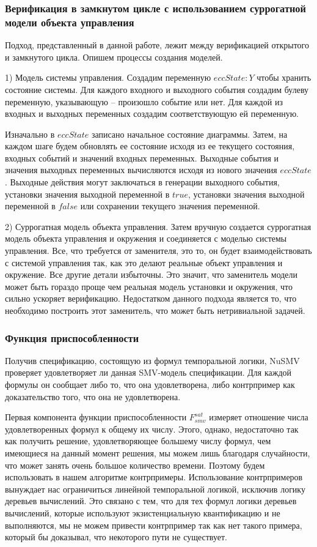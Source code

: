 \documentclass[14pt]{article}
\begin{document}
\subsubsection{Верификация в замкнутом цикле с использованием суррогатной модели
объекта управления}

Подход, представленный в данной работе, лежит между верификацией открытого и
замкнутого цикла. Опишем процессы создания моделей.

1) Модель системы управления. Создадим переменную $eccState : Y$ чтобы хранить
состояние системы. Для каждого входного и выходного события создадим
булеву переменную, указывающую -- произошло событие или нет. Для каждой из
входных и выходных переменных создадим соответствующую ей переменную.

Изначально в $eccState$ записано начальное состояние диаграммы. Затем, на
каждом шаге будем обновлять ее состояние исходя из ее текущего состояния,
входных событий и значений входных переменных. Выходные события и значения
выходных переменных вычисляются исходя из нового значения $eccState$. Выходные
действия могут заключаться в генерации выходного события, установки значения
выходной переменной в $true$, установки значения выходной переменной в $false$
или сохранении текущего значения переменной.

2) Суррогатная модель объекта управления. Затем вручную создается суррогатная модель
объекта управления и окружения и соединяется с моделью системы управления. Все, что
требуется от заменителя, это то, он будет взаимодействовать с системой управления так,
как это делают реальные объект управления и окружение. Все другие детали избыточны. Это
значит, что заменитель модели может быть гораздо проще чем реальная модель
установки и окружения, что сильно ускоряет верификацию. Недостатком данного
подхода является то, что необходимо построить этот заменитель, что может быть
нетривиальной задачей.

\subsubsection{Функция приспособленности}

Получив спецификацию, состоящую из формул темпоральной логики, NuSMV проверяет
удовлетворяет ли данная SMV-модель спецификации. Для каждой формулы он сообщает
либо то, что она удовлетворена, либо контрпример как доказательство того, что
она не удовлетворена.

Первая компонента функции приспособленности $F^{sat}_{smv}$ измеряет
отношение числа удовлетворенных формул к общему их числу. Этого, однако, недостаточно
так как получить решение, удовлетворяющее большему числу формул, чем имеющиеся на данный
момент решения, мы можем лишь благодаря случайности, что может занять очень большое количество времени.
Поэтому будем использовать в нашем алгоритме контрпримеры. Использование контрпримеров
вынуждает нас ограничиться линейной темпоральной логикой, исключив логику
деревьев вычислений. Это связано с тем, что для тех формул логики деревьев
вычислений, которые используют экзистенциальную квантификацию и не выполняются,
мы не можем привести контрпример так как нет такого примера, который бы
доказывал, что некоторого пути не существует.
\end{document}
